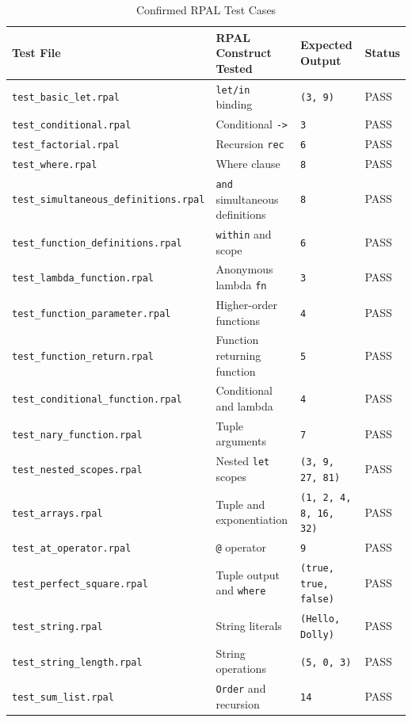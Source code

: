 \documentclass[12pt,a4paper]{article}
\begin{document}
\begin{table}[H]
\centering
\caption{Confirmed RPAL Test Cases}
\label{tab:test-cases}
\scriptsize
\begin{tabular}{p{5.5cm}p{4.5cm}p{3.2cm}p{1.2cm}}
\toprule
Test File & RPAL Construct Tested & Expected Output & Status \\
\midrule
\texttt{test\_basic\_let.rpal} & \texttt{let/in} binding & \texttt{(3, 9)} & PASS \\
\texttt{test\_conditional.rpal} & Conditional \texttt{->} & \texttt{3} & PASS \\
\texttt{test\_factorial.rpal} & Recursion \texttt{rec} & \texttt{6} & PASS \\
\texttt{test\_where.rpal} & Where clause & \texttt{8} & PASS \\
\texttt{test\_simultaneous\_definitions.rpal} & \texttt{and} simultaneous definitions & \texttt{8} & PASS \\
\texttt{test\_function\_definitions.rpal} & \texttt{within} and scope & \texttt{6} & PASS \\
\texttt{test\_lambda\_function.rpal} & Anonymous lambda \texttt{fn} & \texttt{3} & PASS \\
\texttt{test\_function\_parameter.rpal} & Higher-order functions & \texttt{4} & PASS \\
\texttt{test\_function\_return.rpal} & Function returning function & \texttt{5} & PASS \\
\texttt{test\_conditional\_function.rpal} & Conditional and lambda & \texttt{4} & PASS \\
\texttt{test\_nary\_function.rpal} & Tuple arguments & \texttt{7} & PASS \\
\texttt{test\_nested\_scopes.rpal} & Nested \texttt{let} scopes & \texttt{(3, 9, 27, 81)} & PASS \\
\texttt{test\_arrays.rpal} & Tuple and exponentiation & \texttt{(1, 2, 4, 8, 16, 32)} & PASS \\
\texttt{test\_at\_operator.rpal} & \texttt{@} operator & \texttt{9} & PASS \\
\texttt{test\_perfect\_square.rpal} & Tuple output and \texttt{where} & \texttt{(true, true, false)} & PASS \\
\texttt{test\_string.rpal} & String literals & \texttt{(Hello, Dolly)} & PASS \\
\texttt{test\_string\_length.rpal} & String operations & \texttt{(5, 0, 3)} & PASS \\
\texttt{test\_sum\_list.rpal} & \texttt{Order} and recursion & \texttt{14} & PASS \\

\end{tabular}
\end{table}
\end{document}
